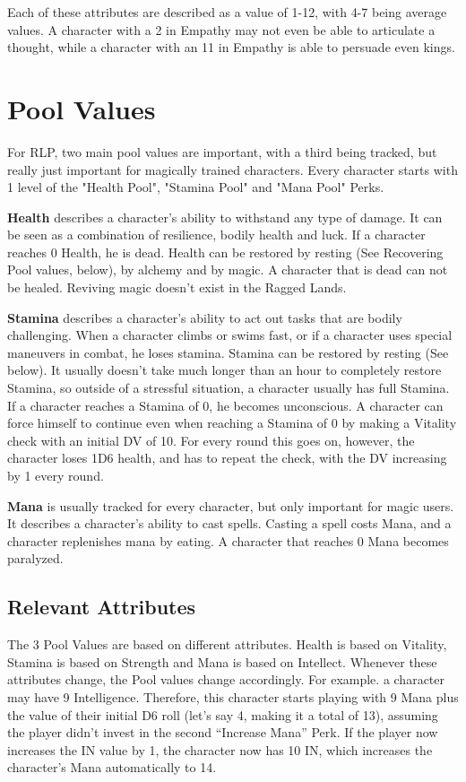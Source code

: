 Each of these attributes are described as a value of 1-12, with 4-7 being average values. A character with a 2 in Empathy may not even be able to articulate a thought, while a character with an 11 in Empathy is able to persuade even kings.

\section{Pool Values}
For RLP, two main pool values are important, with a third being tracked, but really just important for magically trained characters. Every character starts with 1 level of the "Health Pool", "Stamina Pool" and "Mana Pool" Perks.


\textbf{Health} describes a character’s ability to withstand any type of damage. It can be seen as a combination of resilience, bodily health and luck. If a character reaches 0 Health, he is dead. Health can be restored by resting (See Recovering Pool values, below), by alchemy and by magic. A character that is dead can not be healed. Reviving magic doesn’t exist in the Ragged Lands.


\textbf{Stamina} describes a character’s ability to act out tasks that are bodily challenging. When a character climbs or swims fast, or if a character uses special maneuvers in combat, he loses stamina. Stamina can be restored by resting (See below). It usually doesn’t take much longer than an hour to completely restore Stamina, so outside of a stressful situation, a character usually has full Stamina. If a character reaches a Stamina of 0, he becomes unconscious. A character can force himself to continue even when reaching a Stamina of 0 by making a Vitality check with an initial DV of 10. For every round this goes on, however, the character loses 1D6 health, and has to repeat the check, with the DV increasing by 1 every round.


\textbf{Mana} is usually tracked for every character, but only important for magic users. It describes a character’s ability to cast spells. Casting a spell costs Mana, and a character replenishes mana by eating. A character that reaches 0 Mana becomes paralyzed.


\subsection{Relevant Attributes}

The 3 Pool Values are based on different attributes. Health is based on Vitality, Stamina is based on Strength and Mana is based on Intellect. Whenever these attributes change, the Pool values change accordingly. For example. a character may have 9 Intelligence. Therefore, this character starts playing with 9 Mana plus the value of their initial D6 roll (let's say 4, making it a total of 13), assuming the player didn’t invest in the second “Increase Mana” Perk. If the player now increases the IN value by 1, the character now has 10 IN, which increases the character’s Mana automatically to 14.

